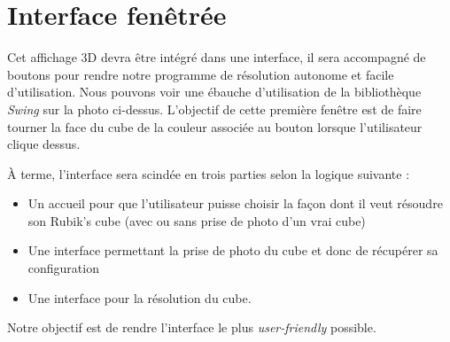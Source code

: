 \section{Interface fenêtrée}
Cet affichage 3D devra être intégré dans une interface, il sera accompagné de boutons pour rendre notre programme de résolution autonome et facile d'utilisation. Nous pouvons voir une ébauche d'utilisation de la bibliothèque \textit{Swing}\cite{cite9} sur la photo ci-dessus. L'objectif de cette première fenêtre est de faire tourner la face du cube de la couleur associée au bouton lorsque l'utilisateur clique dessus.

À terme, l'interface sera scindée en trois parties selon la logique suivante :

\begin{itemize}
    \item Un accueil pour que l'utilisateur puisse choisir la façon dont il veut résoudre son Rubik's cube (avec ou sans prise de photo d'un vrai cube)
    \item Une interface permettant la prise de photo du cube et donc de récupérer sa configuration 
    \item Une interface pour la résolution du cube.
\end{itemize}
Notre objectif est de rendre l'interface le plus \textit{user-friendly} possible.


